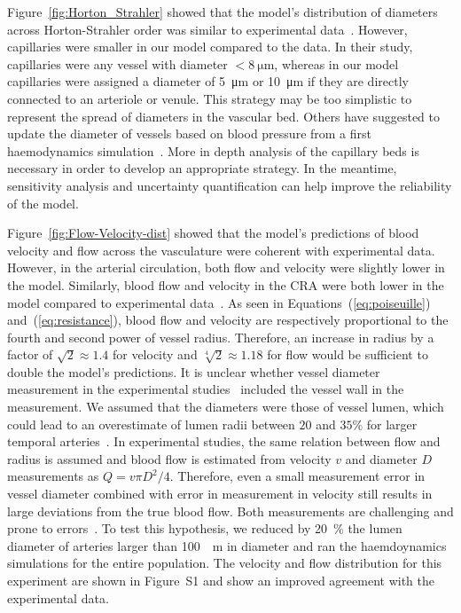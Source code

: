 \documentclass[11pt,]{article}
\begin{document}
Figure~\ref{fig:Horton_Strahler} showed that the model's distribution of diameters across Horton-Strahler order was similar to experimental data~\cite{An2020}.
However, capillaries were smaller in our model compared to the data.
In their study,~\cite{An2020} capillaries were any vessel with diameter $<\SI{8}{\micro\metre}$, whereas in our model capillaries were assigned a diameter of \SI{5}{\micro\metre} or \SI{10}{\micro\metre} if they are directly connected to an arteriole or venule.
This strategy may be too simplistic to represent the spread of diameters in the vascular bed.
Others have suggested to update the diameter of vessels based on blood pressure from a first haemodynamics simulation~\cite{Linninger2013}.
More in depth analysis of the capillary beds is necessary in order to develop an appropriate strategy.
In the meantime, sensitivity analysis and uncertainty quantification can help improve the reliability of the model.

Figure~\ref{fig:Flow-Velocity-dist} showed that the model's predictions of blood velocity and flow across the vasculature were coherent with experimental data.
However, in the arterial circulation, both flow and velocity were slightly lower in the model\cite{Riva1985,DoblhoffDier2014}.
Similarly, blood flow and velocity in the CRA were both lower in the model compared to experimental data~\cite{DoblhoffDier2014,Riva1985,Dorner2009,Feke_1989}.
As seen in Equations~(\ref{eq:poiseuille}) and~(\ref{eq:resistance}), blood flow and velocity are respectively proportional to the fourth and second power of vessel radius.
Therefore, an increase in radius by a factor of $\sqrt{2}\approx 1.4$ for velocity and $\sqrt[4]{2}\approx 1.18$ for flow would be sufficient to double the model's predictions.
It is unclear whether vessel diameter measurement in the experimental studies~\cite{DoblhoffDier2014,Riva1985} included the vessel wall in the measurement.
We assumed that the diameters were those of vessel lumen, which could lead to an overestimate of lumen radii between $20$ and $35\%$ for larger temporal arteries~\cite{Arichika2016,Damian_2021,Meixner_2015}.
In experimental studies, the same relation between flow and radius is assumed and blood flow is estimated from velocity $v$ and diameter $D$ measurements as $Q=v\pi D^2/4$.
Therefore, even a small measurement error in vessel diameter combined with error in measurement in velocity still results in large deviations from the true blood flow.
Both measurements are challenging and prone to errors~\cite{Leitgeb_2014}.
To test this hypothesis, we reduced by \SI{20}{\percent} the lumen diameter of arteries larger than \SI{100}{\mu\metre} in diameter and ran the haemdoynamics simulations for the entire population.
The velocity and flow distribution for this experiment are shown in Figure~S1 and show an improved agreement with the experimental data.
\end{document}
